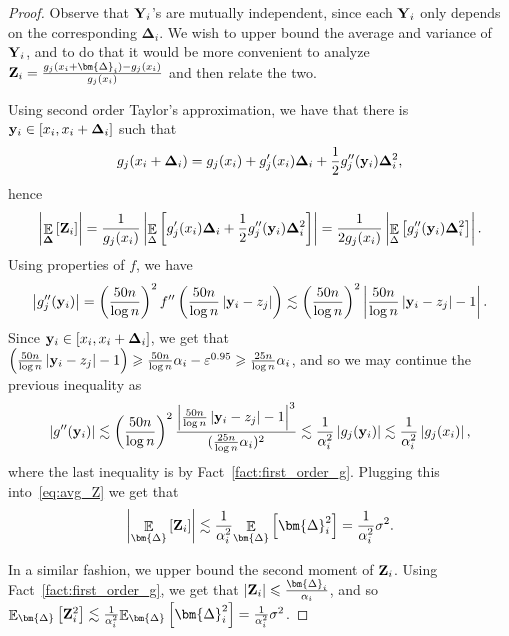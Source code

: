 \documentclass[10pt,a4paper]{article}
\newcommand\card[1]{\left| {#1} \right|}
\newcommand\Expect[2]{{\mathop{\mathbb{E}}_{#1}\left[ {#2} \right]}}
\newcommand\half{{1\over2}}
\newcommand\eps{\varepsilon}
\renewcommand\geq{\geqslant}
\renewcommand\leq{\leqslant}
\newcommand{\De}{\Delta}
\def\ll{\lesssim}
\begin{document}
\begin{proof}
     Observe that ${\bf Y}_i$'s are mutually independent, since each ${\bf Y}_i$ only depends on
	 the corresponding $\bm{\De}_i$. We wish to upper bound the average and variance of ${\bf Y}_i$,
     and to do that it would be more convenient to analyze ${\bf Z}_i = \frac{ g_j(x_i+\bm{\De}_i)-g_j(x_i)}{g_j(x_i)}$
     and then relate the two.

     Using second order Taylor's approximation, we have that there is ${\bf y}_i\in[x_i,x_i+{\bf \De}_i]$ such that
     \[
       g_j(x_i+{\bf \De}_i) = g_j(x_i) + g_j'(x_i){\bf \De}_i + \half g_j''({\bf y}_i){\bf \De}_i^2,
     \]
     hence
     \begin{equation}\label{eq:avg_Z}
       \card{\Expect{{\bf \De}}{{\bf Z}_i}}
       =\frac{1}{g_j(x_i)}\card{\Expect{\De}{g_j'(x_i){\bf \De}_i + \half g_j''({\bf y}_i){\bf \De}_i^2}}
       =\frac{1}{2g_j(x_i)}\card{\Expect{\De}{g_j''({\bf y}_i){\bf \De}_i^2}}.
     \end{equation}
     Using properties of $f$, we have
     \[
     \card{g_j''({\bf y}_i)} =
     \left(\frac{50n}{\log n}\right)^2 f''\left(\frac{50n}{\log n}\card{{\bf y}_i-z_j}\right)
     \ll \left(\frac{50n}{\log n}\right)^2 \card{\frac{50n}{\log n}\card{{\bf y}_i-z_j}-1}.
     \]
     Since ${\bf y}_i\in [x_i,x_i+{\bf \De}_i]$, we get that
     $
     \left(\frac{50n}{\log n}\card{{\bf y}_i-z_j}-1\right)
     \geq \frac{50n}{\log n}\alpha_i - \eps^{0.95}
     \geq \frac{25n}{\log n}\alpha_i
     $,
     and so we may continue the previous inequality as
     \[
     \card{g''({\bf y}_i)}
     \ll \left(\frac{50n}{\log n}\right)^2\frac{\card{\frac{50n}{\log n}\card{{\bf y}_i-z_j}-1}^3}{(\frac{25n}{\log n}\alpha_i)^2}
     \ll \frac{1}{\alpha_i^2} \card{g_j({\bf y}_i)}
     \ll \frac{1}{\alpha_i^2} \card{g_j(x_i)},
     \]
     where the last inequality is by Fact~\ref{fact:first_order_g}.
     Plugging this into~\eqref{eq:avg_Z} we get that
     \[
     \card{\Expect{\bm{\De}}{{\bf Z}_i}}
     \ll \frac{1}{\alpha_i^2} \Expect{\bm{\De}}{\bm{\De}_i^2}
     =\frac{1}{\alpha_i^2} \sigma^2.
     \]

	 In a similar fashion, we upper bound the second moment of ${\bf Z}_i$.
     Using Fact~\ref{fact:first_order_g}, we get that $\card{{\bf Z}_i}\leq \frac{\bm{\De}_i}{\alpha_i}$, and
     so $\Expect{\bm{\De}}{{\bf Z}_i^2}\ll \frac{1}{\alpha_i^2}\Expect{\bm{\De}}{\bm{\De}_i^2} =\frac{1}{\alpha_i^2} \sigma^2$.





\end{proof}
\end{document}
